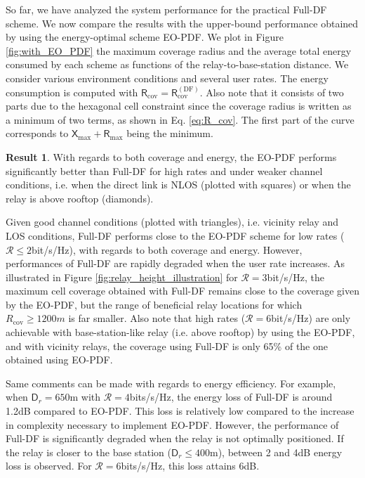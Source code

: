 \documentclass[journal]{IEEEtran}
\theoremstyle{definition}
\newtheorem{result}{Result}
\begin{document}
So far, we have analyzed the system performance for the practical Full-DF scheme. We now compare the results with the upper-bound performance obtained by using the energy-optimal scheme EO-PDF.
We plot in Figure \ref{fig:with_EO_PDF} the maximum coverage radius and the average total energy consumed by each scheme as functions of the relay-to-base-station distance. We consider various environment conditions and several user rates. The energy consumption is computed with $\mathsf{R}_{\text{cov}}= \mathsf{R}_{\text{cov}}^{(\text{DF})}$.
Also note that it consists of two parts due to the hexagonal cell constraint since the coverage radius is written as a minimum of two terms, as shown in Eq. \eqref{eq:R_cov}. The first part of the curve corresponds to $\mathsf{X}_{\max} + \mathsf{R}_{\max}$ being the minimum.

\vspace*{-5pt}\begin{result}
With regards to both coverage and energy, the EO-PDF performs significantly better than Full-DF for high rates and under weaker channel conditions, i.e. when the direct link is NLOS (plotted with squares) or when the relay is above rooftop (diamonds). 
\end{result} \vspace*{-5pt} \noindent
Given good channel conditions (plotted with triangles), i.e. vicinity relay and LOS conditions, Full-DF performs close to the EO-PDF scheme for low rates ($\mathcal{R} \leq 2$bit/s/Hz), with regards to both coverage and energy. However, performances of Full-DF are rapidly degraded when the user rate increases. As illustrated in Figure \ref{fig:relay_height_illustration} for $\mathcal{R}=3$bit/s/Hz, the maximum cell coverage obtained with Full-DF remains close to the coverage given by the EO-PDF, but the range of beneficial relay locations for which $R_{\text{cov}} \geq 1200m$ is far smaller. Also note that high rates ($\mathcal{R}=6$bit/s/Hz) are only achievable with base-station-like relay (i.e. above rooftop) by using the EO-PDF, and with vicinity relays, the coverage using Full-DF is only 65\% of the one obtained using EO-PDF.

Same comments can be made with regards to energy efficiency.
For example, when $\mathsf{D}_r=650$m with $\mathcal{R}=4$bits/s/Hz, the energy loss of Full-DF is around 1.2dB compared to EO-PDF. This loss is relatively low compared to the increase in complexity necessary to implement EO-PDF. However, the performance of Full-DF is significantly degraded when the relay is not optimally positioned. If the relay is closer to the base station ($\mathsf{D}_r \leq 400$m), between 2 and 4dB energy loss is observed. For $\mathcal{R}=6$bits/s/Hz, this loss attains 6dB. 
\end{document}
